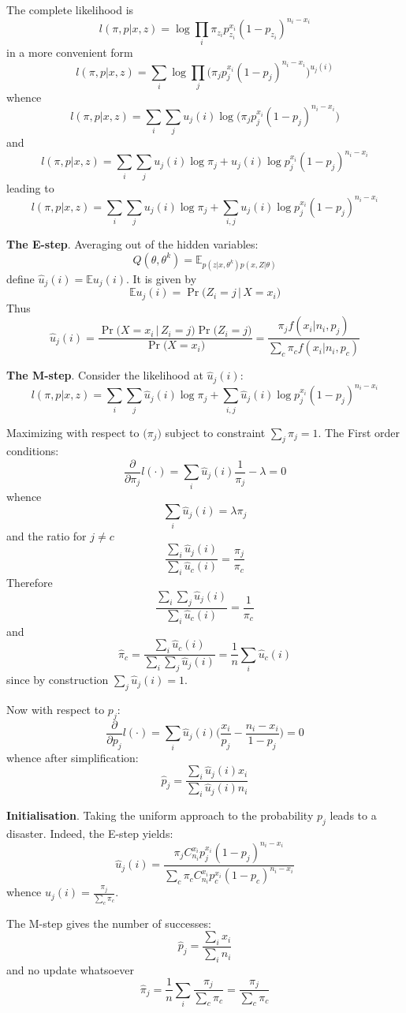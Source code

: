 \documentclass[a4paper]{article}
\newcommand{\Ex}[0]{{\mathbb{E}}}
\begin{document}
The complete likelihood is
\[l(\pi, p\lvert x, z) = \log \prod_i \pi_{z_i} p_{z_i}^{x_i}(1-p_{z_i})^{n_i-x_i}\]
in a more convenient form
\[l(\pi, p\lvert x, z) = \sum_i \log \prod_j \big(\pi_j p_j^{x_i}(1-p_j)^{n_i-x_i}\big)^{u_j(i)}\]
whence
\[l(\pi, p\lvert x, z) = \sum_i\sum_j u_j(i)\log \big(\pi_j p_j^{x_i}(1-p_j)^{n_i-x_i}\big)\]
and 
\[l(\pi, p\lvert x, z) = \sum_i \sum_j u_j(i)\log \pi_j + u_j(i)\log p_j^{x_i}(1-p_j)^{n_i-x_i}\]
leading to 
\[l(\pi, p\lvert x, z) = \sum_i \sum_j u_j(i)\log \pi_j + \sum_{i,j} u_j(i)\log p_j^{x_i}(1-p_j)^{n_i-x_i}\]

\textbf{The E-step}. Averaging out of the hidden variables:
\[Q(\theta, \theta^k) =  \Ex_{p(z\lvert x, \theta^k) p(x,Z\lvert \theta)}\]
define $\hat{u}_j(i) = \Ex u_j(i)$. It is given by 
\[\Ex u_j(i) = \Pr\big(Z_i=j\,\lvert\,X=x_i\big)\]
Thus
\[\hat{u}_j(i) = \frac{\Pr\big(X=x_i\,\lvert\,Z_i=j\big)\Pr\big(Z_i=j\big)}{\Pr\big(X=x_i\big)}
= \frac{ \pi_j f(x_i\lvert n_i, p_j)}{\sum_c \pi_c f(x_i\lvert n_i, p_c)}\]

\textbf{The M-step}. Consider the likelihood at $\hat{u}_j(i)$:
\[l(\pi, p\lvert x, z) = \sum_i \sum_j \hat{u}_j(i)\log \pi_j + \sum_{i,j} \hat{u}_j(i)\log p_j^{x_i}(1-p_j)^{n_i-x_i}\]

Maximizing with respect to $\big(\pi_j\big)$ subject to constraint $\sum_j \pi_j = 1$. The First order conditions:
\[\frac{\partial}{\partial \pi_j} l(\cdot) = \sum_i \hat{u}_j(i)\frac{1}{\pi_j} - \lambda = 0\]
whence
\[\sum_i \hat{u}_j(i) = \lambda \pi_j\]
and the ratio for $j\neq c$
\[\frac{\sum_i \hat{u}_j(i)}{\sum_i \hat{u}_c(i)} = \frac{\pi_j}{\pi_c}\]
Therefore
\[\frac{\sum_i \sum_j \hat{u}_j(i)}{\sum_i \hat{u}_c(i)} = \frac{1}{\pi_c}\]
and 
\[\hat{\pi}_c = \frac{\sum_i \hat{u}_c(i)}{\sum_i \sum_j \hat{u}_j(i)} = \frac{1}{n}\sum_i \hat{u}_c(i)\]
since by construction $\sum_j \hat{u}_j(i)=1$.

Now with respect to $p_j$:
\[\frac{\partial}{\partial p_j} l(\cdot) = \sum_i \hat{u}_j(i) \Big(\frac{x_i}{p_j} - \frac{n_i-x_i}{1-p_j}\Big) = 0\]
whence after simplification:
\[\hat{p}_j = \frac{\sum_i \hat{u}_j(i) x_i }{\sum_i \hat{u}_j(i) n_i}\]

\textbf{Initialisation}. Taking the uniform approach to the probability $p_j$ leads to a disaster.
Indeed, the E-step yields:
\[\hat{u}_j(i) = \frac{ \pi_j C_{n_i}^{x_i} p_j^{x_i}(1-p_j)^{n_i - x_i}}{\sum_c \pi_c C_{n_i}^{x_i} p_c^{x_i}(1-p_c)^{n_i - x_i}}\]
whence $\hat{u}_j(i) = \frac{\pi_j}{\sum_c \pi_c}$.

The M-step gives the number of successes:
\[\hat{p}_j = \frac{\sum_i x_i }{\sum_i n_i}\]
and no update whatsoever
\[\hat{\pi}_j = \frac{1}{n}\sum_i \frac{\pi_j}{\sum_c \pi_c} = \frac{\pi_j}{\sum_c \pi_c}\]
\end{document}
